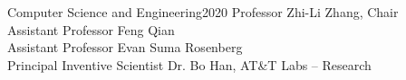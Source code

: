 \documentclass[letterpaper,12pt,oneside]{report}
\theoremstyle{definition} \newtheorem{apitest}{Test}
\begin{document}
{Computer Science and Engineering}{2020}
{Professor Zhi-Li Zhang, Chair \\
Assistant Professor Feng Qian \\
Assistant Professor Evan Suma Rosenberg \\
Principal Inventive Scientist Dr. Bo Han, AT\&T Labs -- Research}


\initializefrontsections





\tableofcontents     %
\listoffigures       %
\listoftables        %



\startthechapters





%

%

%

%



\begin{singlespace}


\end{singlespace}
\end{document}
